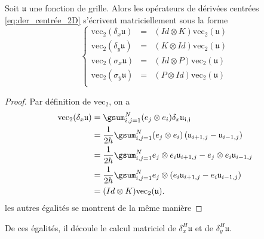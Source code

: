 \begin{proposition}
Soit $\mathfrak{u}$ une fonction de grille. Alors les opérateurs de dérivées centrées \eqref{eq:der_centrée_2D} s'écrivent matriciellement sous la forme
\begin{equation}
\left\lbrace
\begin{array}{rcl}
\text{vec}_2(\delta_x \mathfrak{u}) & = & (Id \otimes K) \text{vec}_2(\mathfrak{u})\\
\text{vec}_2(\delta_y \mathfrak{u}) & = & (K \otimes Id) \text{vec}_2(\mathfrak{u})\\
\text{vec}_2(\sigma_x \mathfrak{u}) & = & (Id \otimes P) \text{vec}_2(\mathfrak{u})\\
\text{vec}_2(\sigma_y \mathfrak{u}) & = & (P \otimes Id) \text{vec}_2(\mathfrak{u})\\
\end{array}\right.
\end{equation}
\label{prop:op_der_simpson_mat}
\end{proposition}

\begin{proof}
Par définition de $\text{vec}_2$, on a 
\begin{align*}
\text{vec}_2 (\delta_x \mathfrak{u}) &= \gsum_{i,j=1}^N (e_j \otimes e_i) \delta_x \mathfrak{u_{i,j}} \\
	&= \dfrac{1}{2h} \gsum_{i,j=1}^N (e_j \otimes e_i) \left( \mathfrak{u}_{i+1,j} - \mathfrak{u}_{i-1,j} \right) \\
	&= \dfrac{1}{2h} \gsum_{i,j=1}^N e_j \otimes e_i \mathfrak{u}_{i+1,j} - e_j \otimes e_i \mathfrak{u}_{i-1,j}\\
	&= \dfrac{1}{2h} \gsum_{i,j=1}^N e_j \otimes (e_i \mathfrak{u}_{i+1,j}-e_i \mathfrak{u}_{i-1,j}) \\
	&= (Id \otimes K) \text{vec}_2(\mathfrak{u}).
\end{align*}
les autres égalités se montrent de la même manière
\end{proof}

De ces égalités, il découle le calcul matriciel de $\delta_x^H \mathfrak{u}$ et de $\delta_y^H \mathfrak{u}$.

